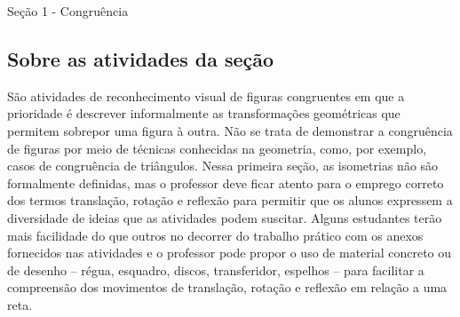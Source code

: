 \begin{paginatexto}{Seção 1 - Congruência}
\subsection{Sobre as atividades da seção}
São atividades de reconhecimento visual de figuras congruentes em que a prioridade é descrever informalmente as transformações geométricas que permitem sobrepor uma figura à outra. Não se trata de demonstrar a congruência de figuras por meio de técnicas conhecidas na geometria, como, por exemplo, casos de congruência de triângulos. Nessa primeira seção, as isometrias não são formalmente definidas, mas o professor deve ficar atento para o emprego correto dos termos translação, rotação e reflexão para permitir que os alunos expressem a diversidade de ideias que as atividades podem suscitar. Alguns estudantes terão mais facilidade do que outros no decorrer do trabalho prático com os anexos fornecidos nas atividades e o professor pode propor o uso de material concreto ou de desenho – régua, esquadro, discos, transferidor, espelhos – para facilitar a compreensão dos movimentos de translação, rotação e reflexão em relação a uma reta. 
\end{paginatexto}

